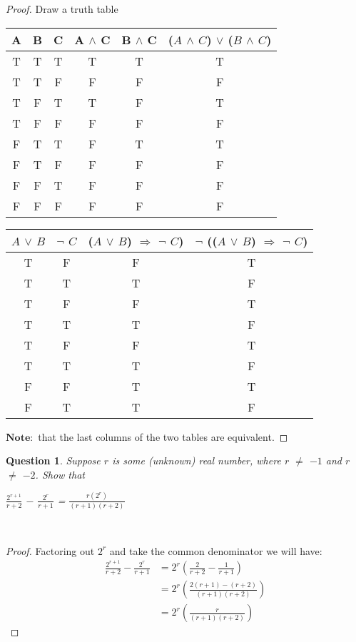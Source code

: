 \documentclass[11pt,oneside]{article}
\newtheorem{question}{Question}
\begin{document}
\begin{proof}
	Draw a truth table
	\begin{center}
		\begin{tabular}{c|c|c|c|c|c}
			A & B & C & A $\land$ C & B $\land$ C & ($A$ $\land$ $C$) $\lor$ ($B$ $\land$ $C$)\\
			\hline
			T & T & T & T & T & T\\
			T & T & F & F & F & F\\
			T & F & T & T & F & T\\
			T & F & F & F & F & F\\
			F & T & T & F & T & T\\
			F & T & F & F & F & F\\
			F & F & T & F & F & F\\
			F & F & F & F & F & F\\
		\end{tabular}
	\end{center}
	\begin{center}
		\begin{tabular}{c|c|c|c}
			$A$ $\lor$ $B$ & $\neg$ $C$ & ($A$ $\lor$ $B$) $\Rightarrow$ $\neg$ $C$) & $\neg$ (($A$ $\lor$ $B$) $\Rightarrow$ $\neg$ $C$)\\
			\hline
			T & F & F & T\\
			T & T & T & F\\
			T & F & F & T\\
			T & T & T & F\\
			T & F & F & T\\
			T & T & T & F\\
			F & F & T & T\\
			F & T & T & F\\
		\end{tabular}
	\end{center}
	$\mathbf{Note:}$ that the last columns of the two tables are equivalent.
\end{proof}

\begin{question}
    Suppose $r$ is some (unknown) real number, where $r$ $\neq$ $-1$ and $r$ $\neq$ $-2$. Show that \\
    
    \centerline{$\frac{2^{r+1}}{r+2}$ $-$ $\frac{2^r}{r+1}$ = $\frac{r(2^r)}{(r+1)(r+2)}$}\
\end{question}

\begin{proof}
    Factoring out $2^r$ and take the common denominator we will have: \\
    
    \begin{align}
	    \frac{2^{r+1}}{r+2} - \frac{2^r}{r+1}& =
	    2^r(\frac{2}{r+2} - \frac{1}{r+1})\\
	    & = 2^r(\frac{2(r+1)-(r+2)}{(r+1)(r+2)})\\
	    & = 2^r(\frac{r}{(r+1)(r+2)})
    \end{align}
    
\end{proof}
\end{document}

